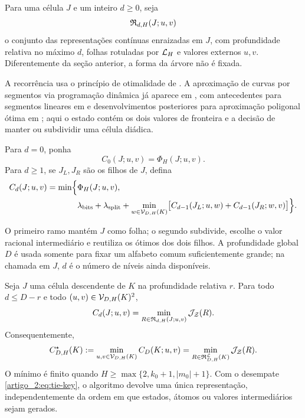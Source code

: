Para uma célula $J$ e um inteiro $d\ge0$, seja
\[
 \mathfrak{R}_{d,H}(J;u,v)
\]
o conjunto das representações contínuas enraizadas em $J$, com profundidade
relativa no máximo $d$, folhas rotuladas por $\mathcal{L}_H$ e valores externos
$u,v$. Diferentemente da seção anterior, a forma da árvore não é fixada.

A recorrência usa o princípio de otimalidade de \citet{artigo_2-bellman1957}. A
aproximação de curvas por segmentos via programação dinâmica já aparece em
\citet{artigo_2-bellman1961}, com antecedentes para segmentos lineares em
\citet{artigo_2-stone1961} e desenvolvimentos posteriores para aproximação poligonal
ótima em \citet{artigo_2-perezvidal1994}; aqui o estado contém os dois valores de
fronteira e a decisão de manter ou subdividir uma célula diádica.

\begin{definition}\label{map:artigo_2:7.1}
\label{artigo_2:def:variable-recurrence}
Para $d=0$, ponha
\begin{equation}
 C_0(J;u,v)=\Phi_H(J;u,v).
 \label{artigo_2:eq:variable-base}
\end{equation}
Para $d\ge1$, se $J_L,J_R$ são os filhos de $J$, defina
\begin{align}
 C_d(J;u,v)
 =\min\Bigl\{&
 \Phi_H(J;u,v),\notag\\
 &\lambda_{\rm bits}+\lambda_{\rm split}
 +\min_{w\in\mathcal{V}_{D,H}(K)}
 \bigl[C_{d-1}(J_L;u,w)+C_{d-1}(J_R;w,v)\bigr]
 \Bigr\}.
 \label{artigo_2:eq:variable-recurrence}
\end{align}
\end{definition}

O primeiro ramo mantém $J$ como folha; o segundo subdivide, escolhe o valor
racional intermediário e reutiliza os ótimos dos dois filhos. A profundidade
global $D$ é usada somente para fixar um alfabeto comum suficientemente
grande; na chamada em $J$, $d$ é o número de níveis ainda disponíveis.

\begin{theorem}\label{map:artigo_2:7.2}
\label{artigo_2:thm:variable-correctness}
Seja $J$ uma célula descendente de $K$ na profundidade relativa $r$. Para todo
$d\le D-r$ e todo $(u,v)\in\mathcal{V}_{D,H}(K)^2$,
\begin{equation}
 C_d(J;u,v)
 =\min_{R\in\mathfrak{R}_{d,H}(J;u,v)}
 \mathcal{J}_{\mathcal Z}(R).
 \label{artigo_2:eq:variable-correctness}
\end{equation}
Consequentemente,
\begin{equation}
 C_{D,H}^{\star}(K)
 :=\min_{u,v\in\mathcal{V}_{D,H}(K)}C_D(K;u,v)
 =\min_{R\in\mathfrak{R}_{D,H}^{\mathcal{L}}(K)}
 \mathcal{J}_{\mathcal Z}(R).
 \label{artigo_2:eq:variable-global}
\end{equation}
O mínimo é finito quando
$H\ge\max\{2,k_0+1,|m_0|+1\}$. Com o desempate
\eqref{artigo_2:eq:tie-key}, o algoritmo devolve uma única representação, independentemente
da ordem em que estados, átomos ou valores intermediários sejam gerados.
\end{theorem}

